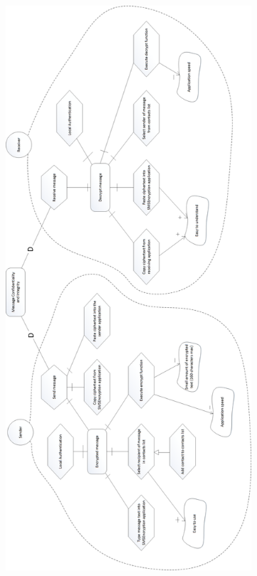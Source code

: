 \begin{center}
 \includegraphics[height=21cm]{diagrams/IStarDiagrams/SMSEncryptionIStarDiagram.png}
\end{center}
